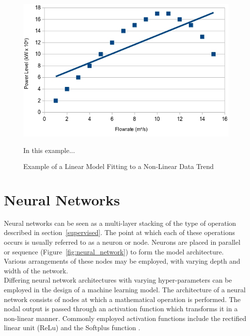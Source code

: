 \begin{figure}[h]
	\centering
	\includegraphics[scale=0.45]{Figures/LinearFit.jpg}
	\caption{Example of a Linear Model Fitting to a Non-Linear Data Trend} {In this example...}
	\label{fig:linearFit}
\end{figure}

 		

\section{Neural Networks} \label{NN}




Neural networks can be seen as a multi-layer stacking of the type of operation described in section~\ref{supervised}. The point at which each of these operations occurs is usually referred to as a neuron or node. Neurons are placed in parallel or sequence (Figure~\ref{fig:neural_network}) to form the model architecture. Various arrangements of these nodes may be employed, with varying depth and width of the network. 
\\

\noindent
Differing neural network architectures with varying hyper-parameters \cite{gurney1997introduction} can be employed in the design of a machine learning model. The architecture of a neural network consists of nodes at which a mathematical operation is performed. The nodal output is passed through an activation function which transforms it in a non-linear manner. Commonly employed activation functions include the rectified linear unit (ReLu) \cite{hara2015analysis} and the Softplus function \cite{zheng2015improving}. 
\\

